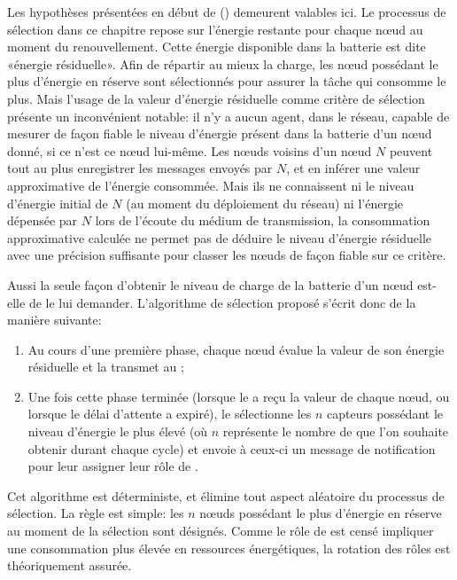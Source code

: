 Les hypothèses présentées en début de  () demeurent valables ici.
Le processus de sélection dans ce chapitre repose sur l'énergie restante pour chaque nœud au moment du renouvellement.
Cette énergie disponible dans la batterie est dite «énergie résiduelle».
Afin de répartir au mieux la charge, les nœud possédant le plus d'énergie en réserve sont sélectionnés pour assurer la tâche qui consomme le plus.
Mais l'usage de la valeur d'énergie résiduelle comme critère de sélection présente un inconvénient notable: il n'y a aucun agent, dans le réseau, capable de mesurer de façon fiable le niveau d'énergie présent dans la batterie d'un nœud donné, si ce n'est ce nœud lui-même.
Les nœuds voisins d'un nœud $N$ peuvent tout au plus enregistrer les messages envoyés par $N$, et en inférer une valeur approximative de l'énergie consommée.
Mais ils ne connaissent ni le niveau d'énergie initial de $N$ (au moment du déploiement du réseau) ni l'énergie dépensée par $N$ lors de l'écoute du médium de transmission, la consommation approximative calculée ne permet pas de déduire le niveau d'énergie résiduelle avec une précision suffisante pour classer les nœuds de façon fiable sur ce critère.

Aussi la seule façon d'obtenir le niveau de charge de la batterie d'un nœud est-elle de le lui demander.
L'algorithme de sélection proposé s'écrit donc de la manière suivante:
\begin{enumerate}
    \item Au cours d'une première phase, chaque nœud évalue la valeur de son énergie résiduelle et la transmet au \ch;
    \item Une fois cette phase terminée (lorsque le \ch a reçu la valeur de chaque nœud, ou lorsque le délai d'attente a expiré), le \CH sélectionne les $n$ capteurs possédant le niveau d'énergie le plus élevé (où $n$ représente le nombre de \cns que l'on souhaite obtenir durant chaque cycle) et envoie à ceux-ci un message de notification pour leur assigner leur rôle de \cn.
\end{enumerate}
Cet algorithme est déterministe, et élimine tout aspect aléatoire du processus de sélection.
La règle est simple: les $n$ nœuds possédant le plus d'énergie en réserve au moment de la sélection sont désignés.
Comme le rôle de \cn est censé impliquer une consommation plus élevée en ressources énergétiques, la rotation des rôles est théoriquement assurée.

